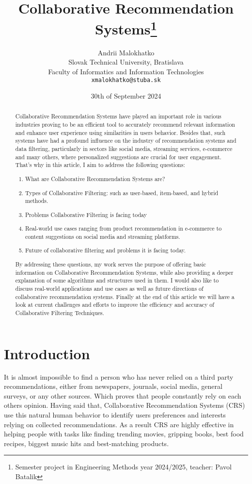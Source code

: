 \documentclass[10pt,a4paper]{article}
\title{Collaborative Recommendation Systems\thanks{Semester project in Engineering Methods year 2024/2025, teacher: Pavol Batalik}}
\author{Andrii Malokhatko\\[2pt]
	{\small Slovak Technical University, Bratislava}\\
	{\small Faculty of Informatics and Information Technologies}\\
	{\small \texttt{xmalokhatko@stuba.sk}}
	}
\date{\small 30th of September 2024}
\begin{document}
\maketitle

\begin{abstract}

Collaborative Recommendation Systems have played an important role in various industries proving to be an efficient tool to accurately recommend relevant information and enhance user experience using similarities in users behavior. Besides that, such systems have had a profound influence on the industry of recommendation systems and data filtering, particularly in sectors like social media, streaming services,  e-commerce and many others, where personalized suggestions are crucial for user engagement. That's why in this article, I aim to address the following questions:
\begin{enumerate}
\item What are Collaborative Recommendation Systems are?
\item Types of Collaborative Filtering: such as user-based, item-based, and hybrid methods.
\item Problems Collaborative Filtering is facing today  
\item Real-world use cases ranging from product recommendation in e-commerce to content suggestions on social media and streaming platforms.
\item Future of collaborative filtering and problems it is facing today.
\end{enumerate}

By addressing these questions, my work serves the purpose of offering basic information on Collaborative Recommendation Systems, while also providing a deeper explanation of some algorithms and structures used in them. I would also like to discuss real-world applications and use cases as well as future directions of collaborative recommendation systems. Finally at the end of this article we will have a look at current challenges and efforts to improve the efficiency and accuracy of Collaborative Filtering Techniques.
\clearpage
\end{abstract}



\section{Introduction}

It is almost impossible to find a person who has never relied on a third party recommendations, either from newspapers, journals, social media, general surveys, or any other sources.  Which proves that people constantly rely on each others opinion. Having said that, Collaborative Recommendation Systems (CRS) use this natural human behavior to identify  users preferences and interests relying on collected recommendations. As a result CRS are highly effective in helping people with tasks like finding trending movies, gripping books, best food recipes, biggest music hits and best-matching products.\cite{10.1155/2009/421425}
\end{document}
